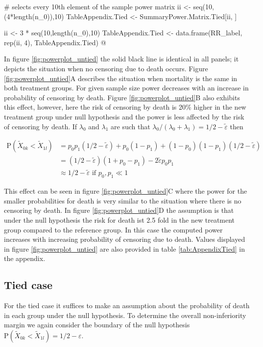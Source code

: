 \documentclass[bimj,fleqn]{w-art}
\theoremstyle{plain}
\theoremstyle{definition}
\begin{document}
# selects every 10th element of the sample power matrix
ii <- seq(10,(4*length(n_0)),10)
TableAppendix.Tied <-  SummaryPower.Matrix.Tied[ii, ]

ii <- 3 * seq(10,length(n_0),10)
TableAppendix.Tied <- data.frame(RR_label,
                            rep(ii, 4),
                            TableAppendix.Tied)
@

In figure \ref{fig:powerplot_untied} the solid black line is identical in all panels; it
depicts the situation when no censoring due to death occurs. Figure
\ref{fig:powerplot_untied}A describes the situation when mortality is the same in both
treatment groups. For given sample size power decreases with an increase in
probability of censoring by death. Figure \ref{fig:powerplot_untied}B also exhibits this
effect, however, here the risk of censoring by death is 20\% higher in the new
treatment group under null hypothesis and the power is less affected by the risk
of censoring by death. If $\lambda_0$ and $\lambda_1$ are such that
$\lambda_0 / (\lambda_0 + \lambda_1) = 1/2 - \tilde{\varepsilon}$ then

\begin{align*}
\text{P}(\widetilde{X}_{0k}  < \widetilde{X}_{1l}) &= p_0 p_1 (1/2 - \tilde{\varepsilon}) + p_0 (1-p_1)  + (1 - p_0)(1 - p_1)(1/2 - \tilde{\varepsilon}) \\
   &= (1/2 - \tilde{\varepsilon})(1 + p_0 - p_1) - 2 \tilde{\varepsilon}p_0 p_1 \\
   &\approx 1/2 - \tilde{\varepsilon} \mbox{ if } p_0, p_1 \ll 1
\end{align*}

This effect can be seen in figure \ref{fig:powerplot_untied}C where the power for the
smaller probabilities for death is very similar to the situation where there is
no censoring by death. In figure \ref{fig:powerplot_untied}D the assumption is that
under the null hypothesis the risk for death ist 2.5 fold in the new treatment
group compared to the reference group. In this case the computed power increases
with increasing probability of censoring due to death. Values displayed in
figure \ref{fig:powerplot_untied} are also provided in table
\ref{tab:AppendixTied} in the appendix.

\subsection{Tied case}
\label{sec:AppTied}
For the tied case it suffices to make an assumption about the probability of death
in each group under the null hypothesis. To determine the overall non-inferiority margin
we again consider the boundary of the null hypothesis
$\text{P}(\widetilde{X}_{0k}  < \widetilde{X}_{1l}) = 1/2 - \varepsilon $.
\end{document}
